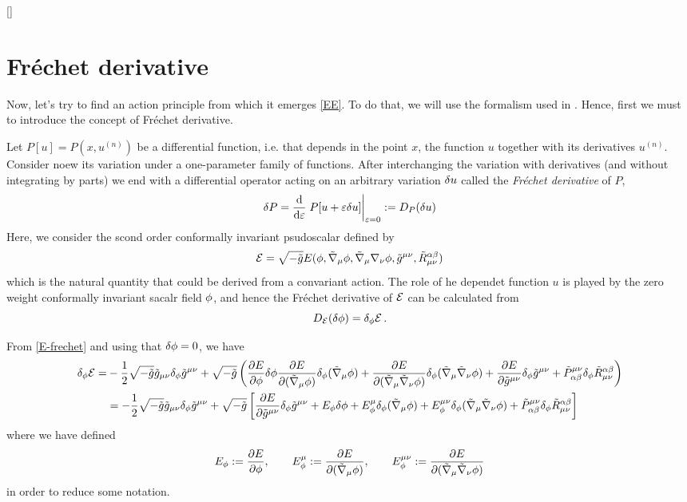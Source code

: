 []


\section{Fréchet derivative}
Now, let's try to find an action principle from which it emerges \eqref{EE}. To do that, we will use the formalism used in \cite{Ayon-Beato:2023bzp}. Hence, first we must to introduce the concept of Fréchet derivative.

Let $P[u]=P\left(x,u^{(n)}\right)$ be a differential function, i.e. that depends in the point $x$, the function $u$ together with its derivatives $u^{(n)}$. Consider noew its variation under a one-parameter family of functions. After interchanging the variation with derivatives (and without integrating by parts) we end with a differential operator acting on an arbitrary variation $\delta u$ called the \textit{Fréchet derivative} of $P$,
\begin{equation}
  \d P=\dv{\varepsilon}\eval{P[u+\varepsilon\d u]}_{\varepsilon=0}:=D_P(\d u)
\end{equation}
Here, we consider the scond order conformally invariant psudoscalar defined by
\begin{equation}\label{E-frechet}
  \mathcal{E}=\sqrt{-\tilde{g}}E(\phi,\tilde{\nabla}_\mu\phi ,\tilde{\nabla}_\mu\nabla_\nu \phi ,\tilde{g}^{\mu\nu },\tilde{R}_{\mu\nu }^{\alpha\beta })
\end{equation}
which is the natural quantity that could be derived from a convariant action. The role of he dependet function $u$ is played by the zero weight conformally invariant sacalr field $\phi$,  and hence the Fréchet derivative of $\mathcal{E}$ can be calculated from
\begin{equation}
  D_{\mathcal{E}}(\delta\phi )=\delta_\phi\mathcal{E}\, .
\end{equation}

From \eqref{E-frechet} and using that $\delta \phi=0$, we have
\begin{align*}
  \delta_\phi \mathcal{E}=&-\frac{1}{2}\sqrt{-\tilde{g}}\tilde{g}_{\mu\nu }\delta_\phi \tilde{g}^{\mu\nu }+\sqrt{-\tilde{g}}\left(\pdv{E}{\phi}\delta\phi \pdv{E}{(\tilde{\nabla}_\mu\phi)}\delta_\phi(\tilde{\nabla}_\mu\phi )+\pdv{E}{(\tilde{\nabla}_\mu\tilde{\nabla}_\nu\phi)}\delta_\phi(\tilde{\nabla}_\mu\tilde{\nabla}_\nu \phi )+\pdv{E}{\tilde{g}^{\mu\nu}}\delta_\phi\tilde{g}^{\mu\nu }+\tilde{P}^{\mu\nu }_{\alpha\beta }\delta_\phi \tilde{R}^{\alpha\beta }_{\mu\nu }\right)\\
  &=-\frac{1}{2}\sqrt{-\tilde{g}}\tilde{g}_{\mu\nu }\delta_\phi \tilde{g}^{\mu\nu }+\sqrt{-\tilde{g}}\left[\pdv{E}{\tilde{g}^{\mu\nu}}\delta_\phi\tilde{g}^{\mu\nu }+ E_\phi\delta\phi +E^\mu_\phi \delta_\phi(\tilde{\nabla}_\mu\phi )+E^{\mu\nu }_\phi \delta_\phi(\tilde{\nabla}_\mu\tilde{\nabla}_\nu\phi )+\tilde{P}^{\mu\nu }_{\alpha\beta }\delta_\phi \tilde{R}^{\alpha\beta }_{\mu\nu }\right]
\end{align*}
where we have defined
\begin{equation}
  E_\phi:=\pdv{E}{\phi},\qquad E^\mu_\phi:=\pdv{E}{(\tilde{\nabla}_\mu\phi)},\qquad E^{\mu\nu }_\phi:=\pdv{E}{(\tilde{\nabla}_\mu\tilde{\nabla}_\nu\phi)}
\end{equation}
in order to reduce some notation.





